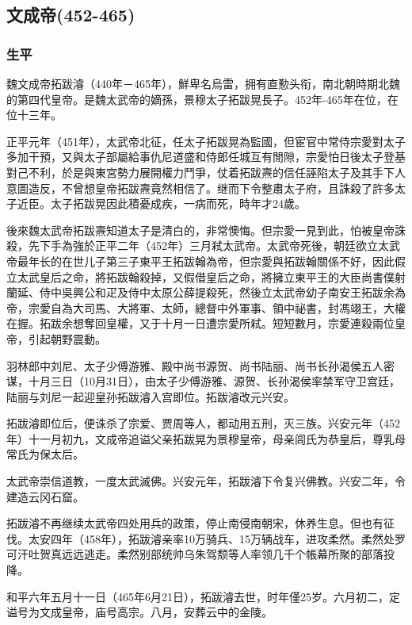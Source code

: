 
\subsection{文成帝\tiny(452-465)}

\subsubsection{生平}

魏文成帝拓跋濬（440年－465年），鮮卑名烏雷，拥有直懃头衔，南北朝時期北魏的第四代皇帝。是魏太武帝的嫡孫，景穆太子拓跋晃長子。452年-465年在位，在位十三年。

正平元年（451年），太武帝北征，任太子拓跋晃為監國，但宦官中常侍宗愛對太子多加干預，又與太子部屬給事仇尼道盛和侍郎任城互有閒隙，宗愛怕日後太子登基對己不利，於是與東宮勢力展開權力鬥爭，仗着拓跋燾的信任誣陷太子及其手下人意圖造反，不曾想皇帝拓跋燾竟然相信了。继而下令整肅太子府，且誅殺了許多太子近臣。太子拓跋晃因此積憂成疾，一病而死，時年才24歲。

後來魏太武帝拓跋燾知道太子是清白的，非常懊悔。但宗愛一見到此，怕被皇帝誅殺，先下手為強於正平二年（452年）三月弒太武帝。太武帝死後，朝廷欲立太武帝最年长的在世儿子第三子東平王拓跋翰為帝，但宗愛與拓跋翰關係不好，因此假立太武皇后之命，將拓跋翰殺掉，又假借皇后之命，將擁立東平王的大臣尚書僕射蘭延、侍中吳興公和疋及侍中太原公薛提殺死，然後立太武帝幼子南安王拓跋余為帝，宗愛自為大司馬、大將軍、太師，總督中外軍事、領中祕書，封馮翊王，大權在握。拓跋余想奪回皇權，又于十月一日遭宗愛所弒。短短數月，宗愛連殺兩位皇帝，引起朝野震動。

羽林郎中刘尼、太子少傅游雅、殿中尚书源贺、尚书陆丽、尚书长孙渴侯五人密谋，十月三日（10月31日），由太子少傅游雅、源贺、长孙渴侯率禁军守卫宫廷，陆丽与刘尼一起迎皇孙拓跋濬入宫即位。拓跋濬改元兴安。

拓跋濬即位后，便诛杀了宗爱、贾周等人，都动用五刑，灭三族。兴安元年（452年）十一月初九，文成帝追谥父亲拓跋晃为景穆皇帝，母亲闾氏为恭皇后，尊乳母常氏为保太后。

太武帝崇信道教，一度太武滅佛。兴安元年，拓跋濬下令复兴佛教。兴安二年，令建造云冈石窟。

拓跋濬不再继续太武帝四处用兵的政策，停止南侵南朝宋，休养生息。但也有征伐。太安四年（458年），拓跋濬亲率10万骑兵、15万辆战车，进攻柔然。柔然处罗可汗吐贺真远远逃走。柔然别部统帅乌朱驾颓等人率领几千个帳幕所聚的部落投降。

和平六年五月十一日（465年6月21日），拓跋濬去世，时年僅25岁。六月初二，定谥号为文成皇帝，庙号高宗。八月，安葬云中的金陵。

